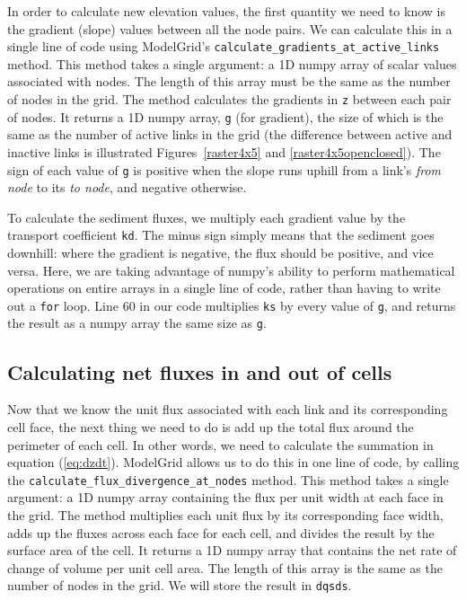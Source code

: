 \documentclass[12pt]{article}
\newcommand{\code}[1]{{\tt #1}}
\begin{document}
In order to calculate new elevation values, the first quantity we need to know is the gradient (slope) values between all the node pairs. We can calculate this in a single line of code using ModelGrid's \code{calculate\_gradients\_at\_active\_links} method. This method takes a single argument: a 1D numpy array of scalar values associated with nodes. The length of this array must be the same as the number of nodes in the grid. The method calculates the gradients in \code{z} between each pair of nodes. It returns a 1D numpy array, \code{g} (for gradient), the size of which is the same as the number of active links in the grid (the difference between active and inactive links is illustrated Figures~\ref{raster4x5} and \ref{raster4x5openclosed}). The sign of each value of \code{g} is positive when the slope runs uphill from a link's {\em from node} to its {\em to node}, and negative otherwise.

To calculate the sediment fluxes, we multiply each gradient value by the transport coefficient \code{kd}. The minus sign simply means that the sediment goes downhill: where the gradient is negative, the flux should be positive, and vice versa. Here, we are taking advantage of numpy's ability to perform mathematical operations on entire arrays in a single line of code, rather than having to write out a \code{for} loop. Line 60 in our code multiplies \code{ks} by every value of \code{g}, and returns the result as a numpy array the same size as \code{g}.

\subsection{Calculating net fluxes in and out of cells}



Now that we know the unit flux associated with each link and its corresponding cell face, the next thing we need to do is add up the total flux around the perimeter of each cell. In other words, we need to calculate the summation in equation (\ref{eq:dzdt}). ModelGrid allows us to do this in one line of code, by calling the \code{calculate\_flux\_divergence\_at\_nodes} method. This method takes a single argument: a 1D numpy array containing the flux per unit width at each face in the grid. The method multiplies each unit flux by its corresponding face width, adds up the fluxes across each face for each cell, and divides the result by the surface area of the cell. It returns a 1D numpy array that contains the net rate of change of volume per unit cell area. The length of this array is the same as the number of nodes in the grid. We will store the result in \code{dqsds}.
\end{document}
